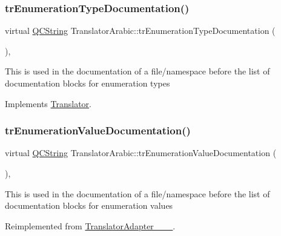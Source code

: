 \subsubsection{\texorpdfstring{trEnumerationTypeDocumentation()}{trEnumerationTypeDocumentation()}}
{\footnotesize\ttfamily virtual \mbox{\hyperlink{class_q_c_string}{Q\+C\+String}} Translator\+Arabic\+::tr\+Enumeration\+Type\+Documentation (\begin{DoxyParamCaption}{ }\end{DoxyParamCaption})\hspace{0.3cm}{\ttfamily [inline]}, {\ttfamily [virtual]}}

This is used in the documentation of a file/namespace before the list of documentation blocks for enumeration types 

Implements \mbox{\hyperlink{class_translator}{Translator}}.

\mbox{\label{class_translator_arabic_ad8811a0183622b8db263162e4b9e8094}} 
\subsubsection{\texorpdfstring{trEnumerationValueDocumentation()}{trEnumerationValueDocumentation()}}
{\footnotesize\ttfamily virtual \mbox{\hyperlink{class_q_c_string}{Q\+C\+String}} Translator\+Arabic\+::tr\+Enumeration\+Value\+Documentation (\begin{DoxyParamCaption}{ }\end{DoxyParamCaption})\hspace{0.3cm}{\ttfamily [inline]}, {\ttfamily [virtual]}}

This is used in the documentation of a file/namespace before the list of documentation blocks for enumeration values 

Reimplemented from \mbox{\hyperlink{class_translator_adapter__1__4__6}{Translator\+Adapter\+\_\+\_\+\_}}.

\mbox{\label{class_translator_arabic_ab18ed450a4ac10051ca9dbcda44ffb99}} 
